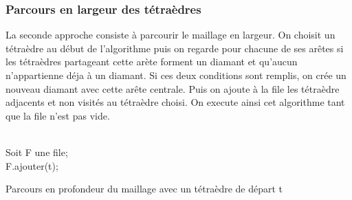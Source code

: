 \documentclass[a4paper,11pt,openany]{article}
\begin{document}
\begin{figure}[H]
\begin{center}
\end{center}
\end{figure}

\subsubsection{Parcours en largeur des tétraèdres}
\label{parcours_largeur}
\noindent
La seconde approche consiste à parcourir le maillage en largeur. On choisit un tétraèdre au début de l'algorithme puis on regarde pour chacune de ses arêtes si les tétraèdres partageant cette arète forment un diamant et qu'aucun n'appartienne déja à un diamant. Si ces deux conditions sont remplis, on crée un nouveau diamant avec cette arête centrale. Puis on ajoute à la file les tétraèdre adjacents et non visités au tétraèdre choisi. On execute ainsi cet algorithme tant que la file n'est pas vide.\\\\
\begin{algorithm}[H]
\SetAlgoLined	
 Soit F une file;\\
 F.ajouter(t);\\
 \caption{Parcours en profondeur du maillage avec un tétraèdre de départ t}
\end{algorithm}
\end{document}
